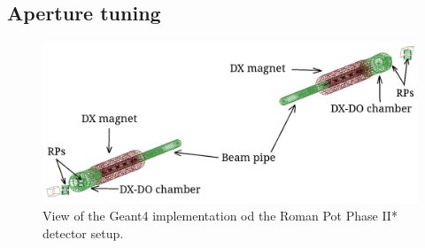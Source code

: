 \subsection{Aperture tuning}

\begin{figure}%
\centering\includegraphics[width=\linewidth]{graphics/rpSim/geant4plot.png}%
\caption{View of the Geant4 implementation od the Roman Pot Phase II* detector setup.}\label{fig:geant4plot}%
\end{figure}

